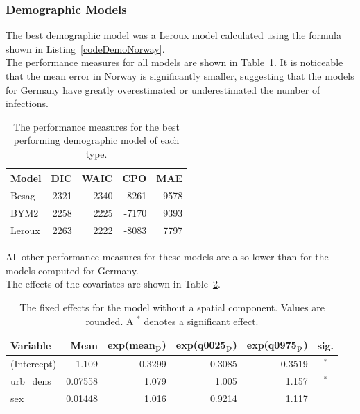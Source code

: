 \subsubsection{Demographic Models}\label{sssec:demoNorway}
The best demographic model was a Leroux model calculated using the formula shown in Listing~\ref{codeDemoNorway}. \\
The performance measures for all models are shown in Table~\ref{demoNorway}. It is noticeable that the mean error in Norway is significantly smaller, suggesting that the models for Germany have greatly overestimated or underestimated the number of infections.
\begin{table}[H] 
\caption{The performance measures for the best performing demographic model of each type. \label{demoNorway}}
\begin{tabular}{l r r r r}
\toprule
\textbf{Model}	& \textbf{DIC}	& \textbf{WAIC} & \textbf{CPO} & \textbf{MAE}\\
\midrule
Besag  & 2321 & 2340 & -8261 & 9578 \\
BYM2 & 2258 & 2225 & -7170 & 9393\\
Leroux & 2263  & 2222 & -8083 & 7797\\
\bottomrule
\end{tabular}
\end{table}
All other performance measures for these models are also lower than for the models computed for Germany. \\
The effects of the covariates are shown in Table~\ref{fixedDemoNorway_spatial}.
\begin{table}[H] 
\caption{The fixed effects for the model without a spatial component. Values are rounded. A $^*$ denotes a significant effect.\label{fixedDemoNorway_spatial}}
\begin{tabular}{l r r r r c}
\toprule
\textbf{Variable}	& \textbf{Mean}	& \textbf{exp(mean$_{\hbox{p}}$)} & \textbf{exp(q0025$_{\hbox{p}}$)} & \textbf{exp(q0975$_{\hbox{p}}$)} & \textbf{sig.}\\
\midrule
(Intercept) & -1.109 & 0.3299 & 0.3085 & 0.3519 & $^*$ \\
urb\_dens & 0.07558 & 1.079 & 1.005 & 1.157 & $^*$ \\
sex & 0.01448 & 1.016 & 0.9214 & 1.117 \\
\bottomrule
\end{tabular}
\end{table}
